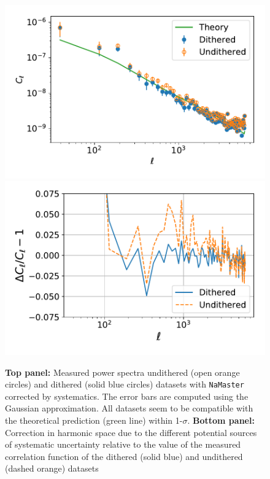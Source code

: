 \documentclass[\docopts]{\docclass}
\begin{document}
\begin{figure}
\centering
\includegraphics[width=0.9\columnwidth]{Cl_25p3_errors}
\includegraphics[width=0.9\columnwidth]{Cl_25p3_sys_comparison}
\caption{{\bf Top panel:} Measured power spectra undithered (open orange circles) and dithered (solid blue circles) datasets with \texttt{NaMaster} corrected by systematics. The error bars are computed using the Gaussian approximation. All datasets seem to be compatible with the theoretical prediction (green line) within 1-$\sigma$. {\bf Bottom panel:} Correction in harmonic space due to the different potential sources of systematic uncertainty relative to the value of the measured correlation function of the dithered (solid blue) and undithered (dashed orange) datasets}
\label{fig:power_spectra}
\end{figure}
\end{document}
